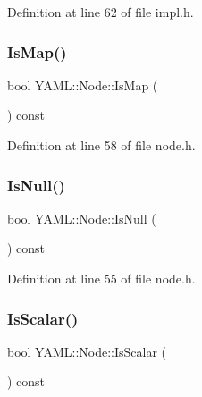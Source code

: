 Definition at line 62 of file impl.\+h.

\mbox{\label{class_y_a_m_l_1_1_node_aab7e81b22940b960c141fc57f04b7d8a}} 
\subsubsection{\texorpdfstring{IsMap()}{IsMap()}}
{\footnotesize\ttfamily bool Y\+A\+M\+L\+::\+Node\+::\+Is\+Map (\begin{DoxyParamCaption}{ }\end{DoxyParamCaption}) const\hspace{0.3cm}{\ttfamily [inline]}}



Definition at line 58 of file node.\+h.

\mbox{\label{class_y_a_m_l_1_1_node_ae46fcc36b16c65a3ff39215bf02ca985}} 
\subsubsection{\texorpdfstring{IsNull()}{IsNull()}}
{\footnotesize\ttfamily bool Y\+A\+M\+L\+::\+Node\+::\+Is\+Null (\begin{DoxyParamCaption}{ }\end{DoxyParamCaption}) const\hspace{0.3cm}{\ttfamily [inline]}}



Definition at line 55 of file node.\+h.

\mbox{\label{class_y_a_m_l_1_1_node_a66c9a35b6c47e18d5df75e946cf2acf5}} 
\subsubsection{\texorpdfstring{IsScalar()}{IsScalar()}}
{\footnotesize\ttfamily bool Y\+A\+M\+L\+::\+Node\+::\+Is\+Scalar (\begin{DoxyParamCaption}{ }\end{DoxyParamCaption}) const\hspace{0.3cm}{\ttfamily [inline]}}



